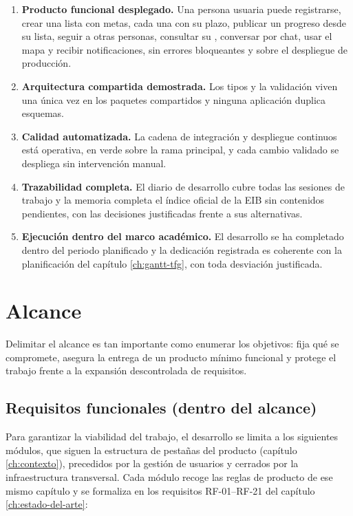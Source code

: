 \begin{enumerate}
  \item \textbf{Producto funcional desplegado.}
        Una persona usuaria puede registrarse, crear una lista con metas, cada una con su plazo, publicar un progreso desde su lista, seguir a otras personas, consultar su , conversar por chat, usar el mapa y recibir notificaciones, sin errores bloqueantes y sobre el despliegue de producción.
  \item \textbf{Arquitectura compartida demostrada.}
        Los tipos y la validación viven una única vez en los paquetes compartidos y ninguna aplicación duplica esquemas.
  \item \textbf{Calidad automatizada.}
        La cadena de integración y despliegue continuos está operativa, en verde sobre la rama principal, y cada cambio validado se despliega sin intervención manual.
  \item \textbf{Trazabilidad completa.}
        El diario de desarrollo cubre todas las sesiones de trabajo y la memoria completa el índice oficial de la \ac{EIB} sin contenidos pendientes, con las decisiones justificadas frente a sus alternativas.
  \item \textbf{Ejecución dentro del marco académico.}
        El desarrollo se ha completado dentro del periodo planificado y la dedicación registrada es coherente con la planificación del capítulo \ref{ch:gantt-tfg}, con toda desviación justificada.
\end{enumerate}

\section{Alcance}
\label{sec:alcance}

Delimitar el alcance es tan importante como enumerar los objetivos: fija qué se compromete, asegura la entrega de un producto mínimo funcional y protege el trabajo frente a la expansión descontrolada de requisitos.

\subsection{Requisitos funcionales (dentro del alcance)}
\label{sec:alcance-dentro}

Para garantizar la viabilidad del trabajo, el desarrollo se limita a los siguientes módulos, que siguen la estructura de pestañas del producto (capítulo \ref{ch:contexto}), precedidos por la gestión de usuarios y cerrados por la infraestructura transversal.
Cada módulo recoge las reglas de producto de ese mismo capítulo y se formaliza en los requisitos RF-01--RF-21 del capítulo \ref{ch:estado-del-arte}:

